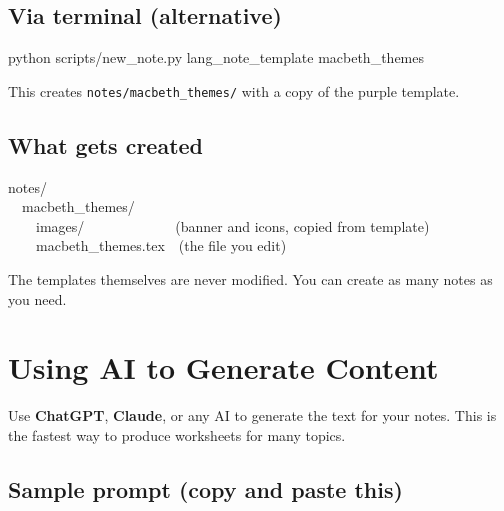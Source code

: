 \documentclass[a4paper,11pt]{article}
\begin{document}
\subsection{Via terminal (alternative)}

\begin{codebox}
{\monofont python scripts/new\_note.py lang\_note\_template macbeth\_themes}
\end{codebox}

This creates \texttt{notes/macbeth\_themes/} with a copy of the purple template.

\subsection{What gets created}

\begin{codebox}
{\monofont
notes/\\
~~macbeth\_themes/\\
~~~~images/~~~~~~~~~~~~~(banner and icons, copied from template)\\
~~~~macbeth\_themes.tex~~(the file you edit)
}
\end{codebox}

The templates themselves are never modified. You can create as many notes as you need.

\section{Using AI to Generate Content}

Use \textbf{ChatGPT}, \textbf{Claude}, or any AI to generate the text for your notes. This is the fastest way to produce worksheets for many topics.

\subsection{Sample prompt (copy and paste this)}
\end{document}
